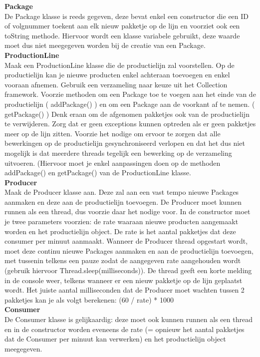 \begin{oefening}
\textbf{Package}\\
De Package klasse is reeds gegeven, deze bevat enkel een constructor die een ID of volgnummer toekent aan elk nieuw pakketje op de lijn en voorziet ook een toString methode. Hiervoor wordt een klasse variabele gebruikt, deze waarde moet dus niet meegegeven worden bij de creatie van een Package.
\\
\textbf{ProductionLine}\\
Maak een ProductionLine klasse die de productielijn zal voorstellen. Op de productielijn kan je nieuwe producten enkel achteraan toevoegen en enkel vooraan afnemen. Gebruik een verzameling naar keuze uit het Collection framework. Voorzie methoden om een Package toe te voegen aan het einde van de productielijn ( addPackage() ) en om een Package aan de voorkant af te nemen. ( getPackage() ) Denk eraan om de afgenomen pakketjes ook van de productielijn te verwijderen. 
Zorg dat er geen exceptions kunnen optreden als er geen pakketjes meer op de lijn zitten.
Voorzie het nodige om ervoor te zorgen dat alle bewerkingen op de productielijn gesynchroniseerd verlopen en dat het dus niet mogelijk is dat meerdere threads tegelijk een bewerking op de verzameling uitvoeren. (Hiervoor moet je enkel aanpassingen doen op de methoden addPackage() en getPackage() van de ProductionLine klasse.
\\
\textbf{Producer}\\
Maak de Producer klasse aan. Deze zal aan een vast tempo nieuwe Packages aanmaken en deze aan de productielijn toevoegen. De Producer moet kunnen runnen als een thread, dus voorzie daar het nodige voor. In de constructor moet je twee parameters voorzien: de rate waaraan nieuwe producten aangemaakt worden en het productielijn object. De rate is het aantal pakketjes dat deze consumer per minuut aanmaakt.
Wanneer de Producer thread opgestart wordt, moet deze continu nieuwe Packages aanmaken en aan de productielijn toevoegen, met tussenin telkens een pauze zodat de aangegeven rate aangehouden wordt (gebruik hiervoor Thread.sleep(milliseconds)). De thread geeft een korte melding in de console weer, telkens wanneer er een nieuw pakketje op de lijn geplaatst wordt.
Het juiste aantal milliseconden dat de Producer moet wachten tussen 2 pakketjes kan je als volgt berekenen: (60 / rate) * 1000
\\
\textbf{Consumer}\\
De Consumer klasse is gelijkaardig: deze moet ook kunnen runnen als een thread en in de constructor worden eveneens de rate (= opnieuw het aantal pakketjes dat de Consumer per minuut kan verwerken) en het productielijn object meegegeven.

\end{oefening}
